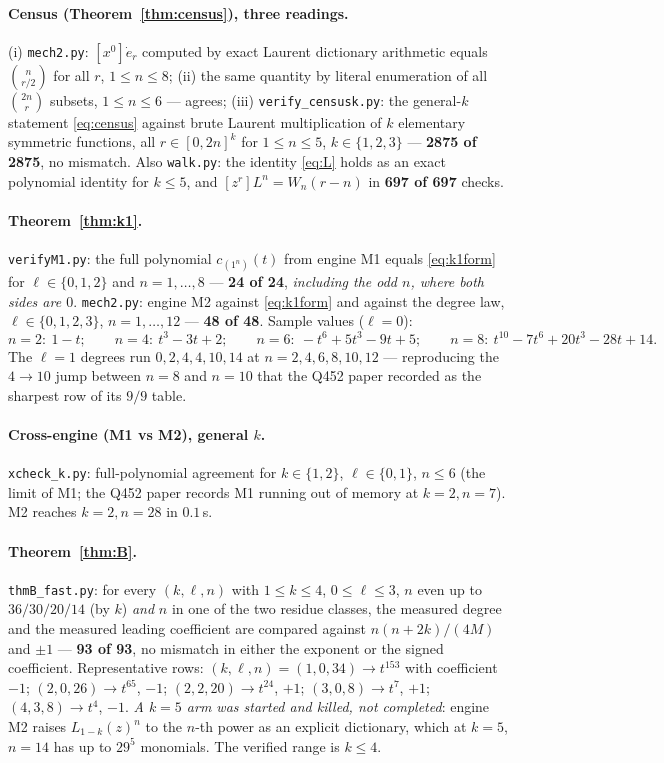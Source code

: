 \documentclass[11pt]{article}
\theoremstyle{plain}
\theoremstyle{definition}
\theoremstyle{remark}
\newcommand{\edot}{\dot{e}}
\newcommand{\onen}{(1^{n})}
\begin{document}
\paragraph{Census (Theorem~\ref{thm:census}), three readings.}
(i) \texttt{mech2.py}: $[x^0]\edot_r$ computed by exact Laurent dictionary arithmetic
equals $\binom{n}{r/2}$ for all $r$, $1\le n\le8$; (ii) the same quantity by literal
enumeration of all $\binom{2n}{r}$ subsets, $1\le n\le6$ --- agrees;
(iii) \texttt{verify\_censusk.py}: the general-$k$ statement \eqref{eq:census} against
brute Laurent multiplication of $k$ elementary symmetric functions, all
$r\in[0,2n]^k$ for $1\le n\le5$, $k\in\{1,2,3\}$ --- \textbf{2875 of 2875}, no mismatch.
Also \texttt{walk.py}: the identity \eqref{eq:L} holds as an exact polynomial identity for
$k\le5$, and $[z^r]L^n=W_n(r-n)$ in \textbf{697 of 697} checks.

\paragraph{Theorem~\ref{thm:k1}.}
\texttt{verifyM1.py}: the full polynomial $c_\onen(t)$ from engine M1 equals
\eqref{eq:k1form} for $\ell\in\{0,1,2\}$ and $n=1,\dots,8$ --- \textbf{24 of 24},
\emph{including the odd $n$, where both sides are $0$}. \texttt{mech2.py}: engine M2
against \eqref{eq:k1form} and against the degree law, $\ell\in\{0,1,2,3\}$,
$n=1,\dots,12$ --- \textbf{48 of 48}. Sample values ($\ell=0$):
\[
  n=2:\ 1-t;\qquad n=4:\ t^3-3t+2;\qquad n=6:\ -t^6+5t^3-9t+5;\qquad
  n=8:\ t^{10}-7t^6+20t^3-28t+14 .
\]
The $\ell=1$ degrees run $0,2,4,4,10,14$ at $n=2,4,6,8,10,12$ --- reproducing the
$4\to10$ jump between $n=8$ and $n=10$ that the Q452 paper recorded as the sharpest row of
its $9/9$ table.

\paragraph{Cross-engine (M1 vs M2), general $k$.}
\texttt{xcheck\_k.py}: full-polynomial agreement for $k\in\{1,2\}$, $\ell\in\{0,1\}$,
$n\le6$ (the limit of M1; the Q452 paper records M1 running out of memory at $k=2,n=7$).
M2 reaches $k=2,n=28$ in $0.1$\,s.

\paragraph{Theorem~\ref{thm:B}.}
\texttt{thmB\_fast.py}: for every $(k,\ell,n)$ with $1\le k\le4$, $0\le\ell\le3$, $n$ even
up to $36/30/20/14$ (by $k$) \emph{and} $n$ in one of the two residue classes, the measured
degree and the measured leading coefficient are compared against $n(n+2k)/(4M)$ and
$\pm1$ --- \textbf{93 of 93}, no mismatch in either the exponent or the signed coefficient.
Representative rows: $(k,\ell,n)=(1,0,34)\to t^{153}$ with coefficient $-1$;
$(2,0,26)\to t^{65}$, $-1$; $(2,2,20)\to t^{24}$, $+1$; $(3,0,8)\to t^{7}$, $+1$;
$(4,3,8)\to t^{4}$, $-1$.
\emph{A $k=5$ arm was started and killed, not completed}: engine M2 raises
$L_{1-k}(z)^n$ to the $n$-th power as an explicit dictionary, which at $k=5$, $n=14$ has
up to $29^5$ monomials. The verified range is $k\le4$.
\end{document}
